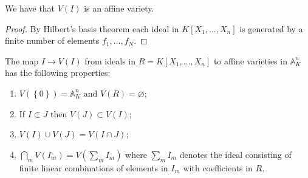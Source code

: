 \documentclass[12pt, a4paper]{article}
\renewcommand{\AA}{\mathbb A}
\begin{document}
\begin{proposition}
    We have that \(V(I)\) is an affine variety.
\end{proposition}

\begin{proof}
    By Hilbert's basis theorem each ideal in \(K[X_1,\ldots,X_n]\) is generated by a finite number of elements \(f_1,\ldots,f_N\).
\end{proof}

\begin{mdprop}
    The map \(I \to V(I)\) from ideals in \(R = K[X_1,\ldots,X_n]\) to affine varieties in \(\AA_K^n\) has the following properties:
    \begin{enumerate}
        \item \(V(\left\{ 0 \right\})=\AA_K^n\) and \(V(R)=\varnothing\);
        \item If \(I \subset J \) then \(V(J)\subset V(I)\);
        \item \(V(I)\cup V(J)=V(I\cap J)\);
        \item \(\bigcap_m V(I_m)=V(\sum_m I_m)\) where \(\sum_m I_m\) denotes the ideal consisting of finite linear combinations of elements in \(I_m\) with coefficients in \(R\).
    \end{enumerate}
\end{mdprop}
\end{document}
